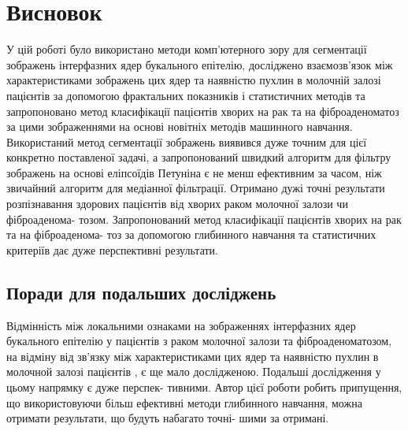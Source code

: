 
\chapter{Висновок} %

\label{Chapter5} %


У цій роботі було використано методи комп'ютерного зору для сегментації зображень інтерфазних ядер букального епітелію, досліджено взаємозв'язок між характеристиками зображень цих ядер та наявністю пухлин в молочній залозі пацієнтів за допомогою фрактальних показників і статистичних методів та запропоновано метод класифікації пацієнтів хворих на рак та на фіброаденоматоз за цими зображеннями на основі новітніх методів машинного навчання. Використаний метод сегментації зображень виявився дуже точним для цієї конкретно поставленої задачі, а запропонований швидкий алгоритм для фільтру зображень на основі еліпсоїдів Петуніна є не менш ефективним за часом, ніж звичайний алгоритм для медіанної фільтрації. Отримано дужі точні результати розпізнавання здорових пацієнтів від хворих раком молочної залози чи фіброаденома- тозом. Запропонований метод класифікації пацієнтів хворих на рак та на фіброаденома- тоз за допомогою глибинного навчання та статистичних критеріїв дає дуже перспективні результати. 



\section{Поради для подальших досліджень}

Відмінність між локальними ознаками на зображеннях інтерфазних ядер букального епітелію у пацієнтів з раком молочної залози та фіброаденоматозом, на відміну від зв'язку між характеристиками цих ядер та наявністю пухлин в молочной залозі пацієнтів \citep{bib:the_beginning}, є ще мало дослідженою. Подальші дослідження у цьому напрямку є дуже перспек- тивними. Автор цієї роботи робить припущення, що використовуючи більш ефективні методи глибинного навчання, можна отримати результати, що будуть набагато точні- шими за отримані.


